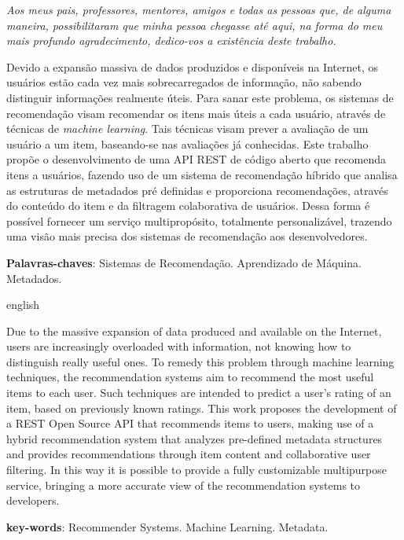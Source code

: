 \documentclass[12pt, openright, oneside, a4paper, brazil]{abntex2}
\begin{document}
\begin{dedicatoria}
	\vspace*{\fill}
	\centering
	\noindent

	\textit{Aos meus pais, professores, mentores, amigos e todas as pessoas que, de alguma maneira, possibilitaram que minha pessoa chegasse até aqui, na forma do meu mais profundo agradecimento, dedico-vos a existência deste trabalho.}

	\vspace*{\fill}
 \end{dedicatoria}

\setlength{\absparsep}{18pt} %
\begin{resumo}

Devido a expansão massiva de dados produzidos e disponíveis na Internet, os usuários estão cada vez mais sobrecarregados de informação, não sabendo distinguir informações realmente úteis. Para sanar este problema, os sistemas de recomendação visam recomendar os itens mais úteis a cada usuário, através de técnicas de \textit{machine learning}. Tais técnicas visam prever a avaliação de um usuário a um item, baseando-se nas avaliações já conhecidas. Este trabalho propõe o desenvolvimento de uma API REST de código aberto que recomenda itens a usuários, fazendo uso de um sistema de recomendação híbrido que analisa as estruturas de metadados pré definidas e proporciona recomendações, através do conteúdo do item e da filtragem colaborativa de usuários. Dessa forma é possível fornecer um serviço multipropósito, totalmente personalizável, trazendo uma visão mais precisa dos sistemas de recomendação aos desenvolvedores.

\textbf{Palavras-chaves}: Sistemas de Recomendação. Aprendizado de Máquina. Metadados.
\end{resumo}

\begin{resumo}[Abstract]
\begin{otherlanguage*}{english}

Due to the massive expansion of data produced and available on the Internet, users are increasingly overloaded with information, not knowing how to distinguish really useful ones. To remedy this problem through machine learning techniques, the recommendation systems aim to recommend the most useful items to each user. Such techniques are intended to predict a user's rating of an item, based on previously known ratings. This work proposes the development of a REST Open Source API that recommends items to users, making use of a hybrid recommendation system that analyzes pre-defined metadata structures and provides recommendations through item content and collaborative user filtering. In this way it is possible to provide a fully customizable multipurpose service, bringing a more accurate view of the recommendation systems to developers.

\textbf{key-words}: Recommender Systems. Machine Learning. Metadata.
\end{otherlanguage*}
\end{resumo}
\end{document}

